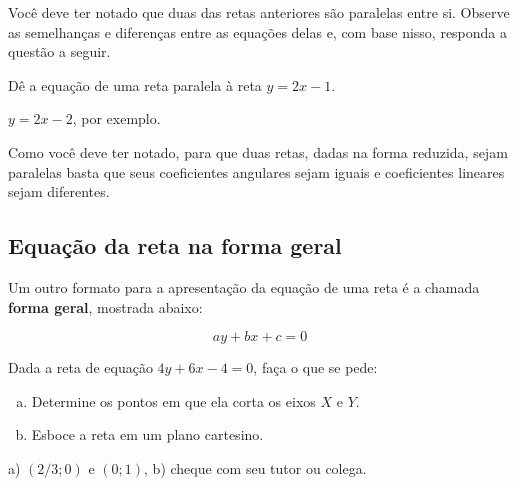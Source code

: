 \documentclass[main.tex]{subfiles}
\begin{document}
Você deve ter notado que duas das retas anteriores são paralelas entre si. Observe as semelhanças e diferenças entre as equações delas e, com base nisso, responda a questão a seguir.

\begin{questao}
Dê a equação de uma reta paralela à reta $y=2x-1$.
\end{questao}


\begin{gabarito}
	\begin{gabaritoQuestao}
		$y=2x-2$, por exemplo.
	\end{gabaritoQuestao}
\end{gabarito}


Como você deve ter notado, para que duas retas, dadas na forma reduzida, sejam paralelas basta que seus coeficientes angulares sejam iguais e coeficientes lineares sejam diferentes.

\subsection*{Equação da reta na forma geral}

Um outro formato para a apresentação da equação de uma reta é a chamada \textbf{forma geral}, mostrada abaixo:

$$ay+bx+c=0$$

\begin{questao}
Dada a reta de equação $4y+6x-4=0$, faça o que se pede:
\begin{enumerate}[a)]
\item Determine os pontos em que ela corta os eixos $X$ e $Y$.
\item Esboce a reta em um plano cartesino.
\end{enumerate} 
\end{questao}


\begin{gabarito}
	\begin{gabaritoQuestao}
		a) $(2/3;0)$ e $(0;1)$, b) cheque com seu tutor ou colega.
	\end{gabaritoQuestao}
\end{gabarito}
\end{document}
